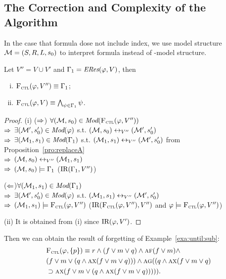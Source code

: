 \documentclass[letterpaper]{article} %
\begin{document}
\subsection{The Correction and Complexity of the Algorithm}
In the case that formula dose not include index, we use model structure ${\cal M}=(S,R,L, s_0)$ to interpret formula instead of \Ind-model structure. 


\begin{theorem}\label{thm:Res_based:V_CTLforget}
Let $V''=V \cup V'$ and $\Gamma_1=\emph{ERes}(\varphi,V)$, then %
\begin{enumerate}[(i)]
\item ${\textsc{F}_{\textsc{ctl}}}(\varphi, V'') \equiv \Gamma_1$;
\item ${\textsc{F}_{\textsc{ctl}}}(\varphi, V) \equiv \bigwedge_{\psi \in \Gamma_1} \psi$.
\end{enumerate}
\end{theorem}
\begin{proof}
(i) ($\Rightarrow$) $\forall ({\cal M},s_0) \in \textit{Mod}({\textsc{F}_{\textsc{ctl}}}(\varphi, V''))$\\
 $\Rightarrow$ $\exists ({\cal M}',s_0') \in \textit{Mod}(\varphi)$ s.t. $({\cal M},s_0) \leftrightarrow_{V''} ({\cal M}', s_0')$\\
 $\Rightarrow$ $\exists ({\cal M}_1, s_1) \in \textit{Mod}(\Gamma_1)$ s.t. $({\cal M}_1,s_1) \leftrightarrow_{V''} ({\cal M}', s_0')$ from Proposition~\ref{pro:replaceA}\\
 $\Rightarrow$ $({\cal M},s_0) \leftrightarrow_{V''} ({\cal M}_1,s_1)$\\
 $\Rightarrow$ $({\cal M},s_0) \models \Gamma_1$ \hfill ($\textrm{IR}(\Gamma_1, V'')$)

 ($\Leftarrow$)$\forall ({\cal M}_1, s_1) \in \textit{Mod}(\Gamma_1)$\\
 $\Rightarrow$ $\exists ({\cal M}',s_0') \in \textit{Mod}(\varphi)$ s.t. $({\cal M}_1,s_1) \leftrightarrow_{V''} ({\cal M}', s_0')$ \\
 $\Rightarrow$ $({\cal M}_1, s_1) \models {\textsc{F}_{\textsc{ctl}}}(\varphi, V'')$ \hfill ($\textrm{IR}({\textsc{F}_{\textsc{ctl}}}(\varphi, V''), V'')$ and $\varphi \models {\textsc{F}_{\textsc{ctl}}}(\varphi, V'')$)
 
 (ii) It is obtained from (i) since $\textrm{IR}(\varphi, V')$.
\end{proof}

Then we can obtain the result of forgetting of Example~\ref{exa:until:sub}:
\begin{align*}
& {\textsc{F}_{\textsc{ctl}}}(\varphi, \{p\}) \equiv r\wedge (f\vee m \vee q)  \wedge  \textsc{a}\textsc{f}(f \vee m) \wedge\\
& (f\vee m \vee (q\wedge \textsc{a}\textsc{x}(f\vee m\vee q)))  \wedge \textsc{a}\textsc{g}((q\wedge \textsc{a}\textsc{x}(f\vee m\vee q)\\
& \supset \textsc{a}\textsc{x}(f\vee m \vee (q\wedge \textsc{a}\textsc{x}(f\vee m\vee q))))).
\end{align*}
\end{document}
